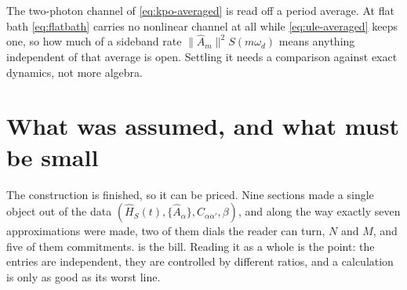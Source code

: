 \documentclass[a4paper,11pt]{article}
\begin{document}
\begin{todo}
The two-photon channel of \eqref{eq:kpo-averaged} is read off a period average. At flat bath \eqref{eq:flatbath} carries no nonlinear channel at all while \eqref{eq:ule-averaged} keeps one, so how much of a sideband rate $\lVert\hat A_m\rVert^2 S(m\omega_d)$ means anything independent of that average is open. Settling it needs a comparison against exact dynamics, not more algebra.
\end{todo}

\section{What was assumed, and what must be small}\label{sec:ledger}

The construction is finished, so it can be priced. Nine sections made a single object out of the data $(\hat H_S(t),\{\hat A_\alpha\},C_{\alpha\alpha'},\beta)$, and along the way exactly seven approximations were made, two of them dials the reader can turn, $N$ and $M$, and five of them commitments.  is the bill. Reading it as a whole is the point: the entries are independent, they are controlled by different ratios, and a calculation is only as good as its worst line.
\end{document}
